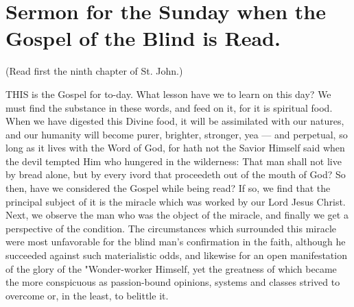 \chapter{Sermon for the Sunday when the Gospel of the Blind is Read.}

(Read first the ninth chapter of St. John.)

THIS is the Gospel for to-day. What lesson 
have we to learn on this day? We must 
find the substance in these words, and feed on it, 
for it is spiritual food. When we have digested 
this Divine food, it will be assimilated with our 
natures, and our humanity will become purer, 
brighter, stronger, yea — and perpetual, so long 
as it lives with the Word of God, for hath not 
the Savior Himself said when the devil tempted 
Him who hungered in the wilderness: That 
man shall not live by bread alone, but by every 
ivord that proceedeth out of the mouth of God? 
So then, have we considered the Gospel while 
being read? If so, we find that the principal 
subject of it is the miracle which was worked by 
our Lord Jesus Christ. Next, we observe the 
man who was the object of the miracle, and 
finally we get a perspective of the condition. 
The circumstances which surrounded this miracle
were most unfavorable for the blind man's 
confirmation in the faith, although he succeeded 
against such materialistic odds, and likewise for 
an open manifestation of the glory of the "Wonder-worker
Himself, yet the greatness of which 
became the more conspicuous as passion-bound 
opinions, systems and classes strived to overcome
or, in the least, to belittle it. 

